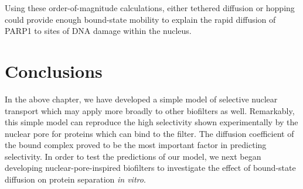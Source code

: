 Using these order-of-magnitude calculations, either tethered diffusion or hopping could provide enough bound-state mobility to explain the rapid diffusion of PARP1 to sites of DNA damage within the nucleus.

\section{Conclusions}

In the above chapter, we have developed a simple model of selective nuclear transport which may apply more broadly to other biofilters as well.  Remarkably, this simple model can reproduce the high selectivity shown experimentally by the nuclear pore for proteins which can bind to the filter.  The diffusion coefficient of the bound complex proved to be the most important factor in predicting selectivity.  In order to test the predictions of our model, we next began developing nuclear-pore-inspired biofilters to investigate the effect of bound-state diffusion on protein separation \textit{in vitro}.
